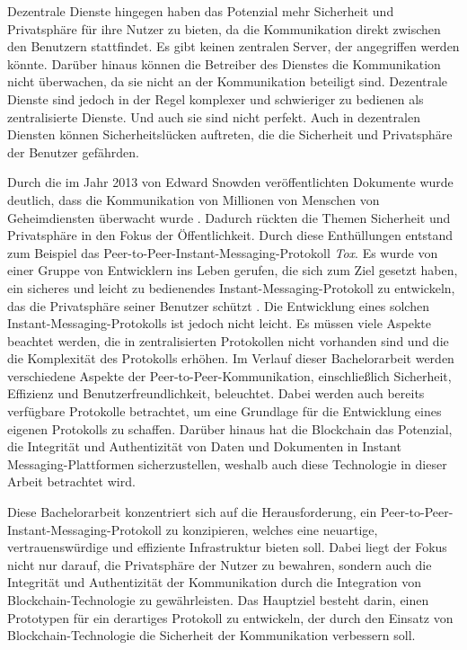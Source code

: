 Dezentrale Dienste hingegen haben das Potenzial mehr Sicherheit und Privatsphäre für ihre Nutzer zu bieten, da die Kommunikation direkt zwischen den Benutzern stattfindet. Es gibt keinen zentralen Server, der angegriffen werden könnte. Darüber hinaus können die Betreiber des Dienstes die Kommunikation nicht überwachen, da sie nicht an der Kommunikation beteiligt sind. Dezentrale Dienste sind jedoch in der Regel komplexer und schwieriger zu bedienen als zentralisierte Dienste. Und auch sie sind nicht perfekt. Auch in dezentralen Diensten können Sicherheitslücken auftreten, die die Sicherheit und Privatsphäre der Benutzer gefährden.

Durch die im Jahr 2013 von Edward Snowden veröffentlichten Dokumente wurde deutlich, dass die Kommunikation von Millionen von Menschen von Geheimdiensten überwacht wurde \parencite{greenwald_NSA}. Dadurch rückten die Themen Sicherheit und Privatsphäre in den Fokus der Öffentlichkeit. Durch diese Enthüllungen entstand zum Beispiel das Peer-to-Peer-Instant-Messaging-Protokoll \textit{Tox}. Es wurde von einer Gruppe von Entwicklern ins Leben gerufen, die sich zum Ziel gesetzt haben, ein sicheres und leicht zu bedienendes Instant-Messaging-Protokoll zu entwickeln, das die Privatsphäre seiner Benutzer schützt \parencite{tox_about}. Die Entwicklung eines solchen Instant-Messaging-Protokolls ist jedoch nicht leicht. Es müssen viele Aspekte beachtet werden, die in zentralisierten Protokollen nicht vorhanden sind und die die Komplexität des Protokolls erhöhen. Im Verlauf dieser Bachelorarbeit werden verschiedene Aspekte der Peer-to-Peer-Kommunikation, einschließlich Sicherheit, Effizienz und Benutzerfreundlichkeit, beleuchtet. Dabei werden auch bereits verfügbare Protokolle betrachtet, um eine Grundlage für die Entwicklung eines eigenen Protokolls zu schaffen. Darüber hinaus hat die Blockchain das Potenzial, die Integrität und Authentizität von Daten und Dokumenten in Instant Messaging-Plattformen sicherzustellen, weshalb auch diese Technologie in dieser Arbeit betrachtet wird.

Diese Bachelorarbeit konzentriert sich auf die Herausforderung, ein Peer-to-Peer-Instant-Messaging-Protokoll zu konzipieren, welches eine neuartige, vertrauenswürdige und effiziente Infrastruktur bieten soll. Dabei liegt der Fokus nicht nur darauf, die Privatsphäre der Nutzer zu bewahren, sondern auch die Integrität und Authentizität der Kommunikation durch die Integration von Blockchain-Technologie zu gewährleisten. Das Hauptziel besteht darin, einen Prototypen für ein derartiges Protokoll zu entwickeln, der durch den Einsatz von Blockchain-Technologie die Sicherheit der Kommunikation verbessern soll.
